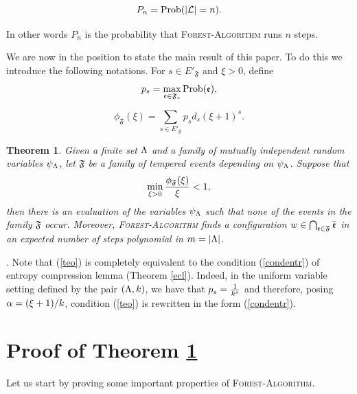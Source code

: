 \documentclass[11pt]{article}
\newtheorem{theo}{Theorem}[section]
\let\a=\alpha \let\b=\beta \let\ch=\chi \let\d=\delta \let\e=\varepsilon
\let\\=\noindent
\def\ee{\end{equation}}
\def\be{\begin{equation}}
\let\a=\alpha \let\b=\beta \let\ch=\chi \let\d=\delta \let\e=\varepsilon
\let\\=\noindent
\def\ee{\end{equation}}
\def\be{\begin{equation}}
\def\prob{{\rm Prob}}
\def\ev{{\mathfrak{e}}}
\def\FF{{\mathfrak{F}}}
\begin{document}
\begin{equation}\label{p1}
  P_n= \prob(|\mathcal{L}|=n).
\end{equation}

\\In other words $P_n$ is the probability that \textsc{Forest-Algorithm} runs $n$ steps.



\\We are now in the position to state the main result of this paper. To do this we introduce the following notations. For $s\in E'_\FF$ and $\xi>0$, define
 \begin{equation}\label{pij}
 p_s=\max_{\ev\in \FF_s} \prob(\ev),
 \end{equation}

\be\label{fea}
 \phi_{\FF}(\xi)= \sum_{s\in E'_\FF}p_s d_s (\xi+1)^{s}.
\ee

 \begin{theo}\label{teo1}
 Given  a finite set $\Lambda$  and  a family of mutually independent random variables $\psi_\Lambda$,
 let $\FF$ be a family of tempered events depending on $\psi_\Lambda$.
 Suppose that
\be\label{teo}
 \min_{\x>0} {\phi_{\FF}(\x)\over \x} <1,
\ee
then there is an evaluation of the variables $\psi_\Lambda$ such that none of the events in the family $\FF$ occur. Moreover,  \textsc{Forest-Algorithm} finds a configuration $w\in \bigcap_{\ev\in \fa}\bar \ev$  in an expected number of steps polynomial  in $m=|\Lambda|$.
\end{theo}

\\{\bf Remark}. Note that (\ref{teo}) is completely equivalent to the condition (\ref{condentr}) of entropy compression lemma (Theorem \ref{ecl}). Indeed, in the uniform variable setting defined by the pair $(\Lambda,k)$, we have that $p_s={1\over k^s}$ and therefore, posing $\a={(\x+1)/ k}$, condition (\ref{teo})  is
rewritten
in the form (\ref{condentr}).

\section{Proof of Theorem \ref{teo1}}\label{proof}

Let us start by proving some important properties of \textsc{ Forest-Algorithm}.
\end{document}
